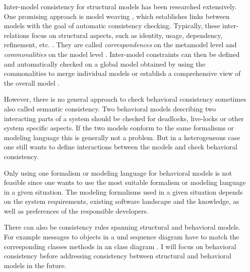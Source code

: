 \documentclass[conference]{IEEEtran}
\begin{document}
Inter-model consistency for structural models has been researched extensively.
One promising approach is model weaving \cite{bezivinCanonicalSchemeModel2006}, which establishes links between models with the goal of automatic consistency checking.
Typically, these inter-relations focus on structural aspects, such as identity, usage, dependency, refinement, etc. \cite{stunkelComprehensiveSystemsFormal2021}.
They are called \textit{correspondences} on the metamodel level and \textit{commonalities} on the model level \cite{stunkelComprehensiveSystemsFormal2021, klareCommonalitiesPreservingConsistency2019}.
Inter-model constraints can then be defined and automatically checked on a global model obtained by using the commonalities to merge individual models \cite{stunkelMultimodelCorrespondenceIntermodel2018} or establish a comprehensive view of the overall model \cite{stunkelMultipleModelSynchronization2020}.

However, there is no general approach to check behavioral consistency sometimes also called semantic consistency.
Two behavioral models describing two interacting parts of a system should be checked for deadlocks, live-locks or other system specific aspects.
If the two models conform to the same formalisms or modeling language this is generally not a problem.
But in a heterogeneous case one still wants to define interactions between the models and check behavioral consistency.

Only using one formalism or modeling language for behavioral models is not feasible since one wants to use the most suitable formalism or modeling language in a given situation.
The modeling formalisms used in a given situation depends on the system requirements, existing software landscape and the knowledge, as well as preferences of the responsible developers. 

There can also be consistency rules spanning structural and behavioral models.
For example messages to objects in a \gls{uml} sequence diagram have to match the corresponding classes methods in an class diagram \cite{egyedFixingInconsistenciesUML2007}.
I will focus on behavioral consistency before addressing consistency between structural and behavioral models in the future. 
\end{document}
